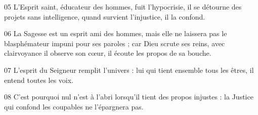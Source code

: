
05 L’Esprit saint, éducateur des hommes, fuit l’hypocrisie, il se détourne des projets sans intelligence, quand survient l’injustice, il la confond.

06 La Sagesse est un esprit ami des hommes, mais elle ne laissera pas le blasphémateur impuni pour ses paroles ; car Dieu scrute ses reins, avec clairvoyance il observe son cœur, il écoute les propos de sa bouche.

07 L’esprit du Seigneur remplit l’univers : lui qui tient ensemble tous les êtres, il entend toutes les voix.

08 C’est pourquoi nul n’est à l’abri lorsqu’il tient des propos injustes : la Justice qui confond les coupables ne l’épargnera pas.

